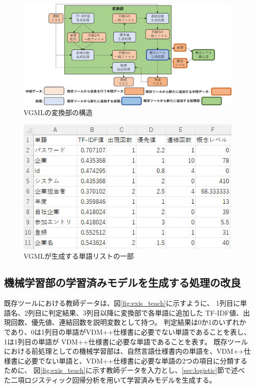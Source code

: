 \begin{figure}[t]
    \begin{center}
        \includegraphics[width=1.0\columnwidth]{image/vgml_transfer.png}
        \caption{VGMLの変換部の構造}
        \label{fig:vgml_transfer}
    \end{center}
\end{figure}

\begin{figure}[t]
    \begin{center}
        \includegraphics[width=1.0\columnwidth]{image/vgml_word_list.png}
        \caption{VGMLが生成する単語リストの一部}
        \label{fig:vgml_word_list}
    \end{center}
\end{figure}

\subsection{機械学習部の学習済みモデルを生成する処理の改良}
\label{sec:vgml_train_model}
既存ツールにおける教師データは、図\ref{fig:exis_teach}に示すように、
1列目に単語名、2列目に判定結果、3列目以降に変換部で各単語に追加した TF-IDF値、出現回数、優先値、連結回数を説明変数として持つ。
判定結果は0か1のいずれかであり、0は1列目の単語がVDM++仕様書に必要でない単語であることを表し、
1は1列目の単語が VDM++仕様書に必要な単語であることを表す。
既存ツールにおける前処理としての機械学習部は、自然言語仕様書内の単語を、VDM++仕様書に必要でない単語と、VDM++仕様書に必要な単語の2つの項目に分類するために、
図\ref{fig:exis_teach}に示す教師データを入力とし、\ref{sec:logistic}節で述べた二項ロジスティック回帰分析を用いて学習済みモデルを生成する。

